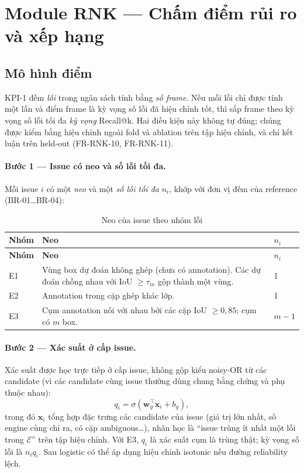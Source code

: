 \section{Module RNK — Chấm điểm rủi ro và xếp hạng}
\label{sec:fr-rnk}

\subsection{Mô hình điểm}
KPI-1 đếm \emph{lỗi} trong ngân sách tính bằng \emph{số frame}. Nếu mỗi lỗi chỉ
được tính một lần và điểm frame là kỳ vọng số lỗi đã hiệu chỉnh tốt, thì sắp
frame theo kỳ vọng số lỗi tối đa \emph{kỳ vọng} Recall@k. Hai điều kiện này không
tự đúng; chúng được kiểm bằng hiệu chỉnh ngoài fold và ablation trên tập hiệu
chỉnh, và chỉ kết luận trên held-out (FR-RNK-10, FR-RNK-11).

\paragraph{Bước 1 — Issue có neo và số lỗi tối đa.}
Mỗi issue \(i\) có một \emph{neo} và một \emph{số lỗi tối đa} \(n_i\), khớp với
đơn vị đếm của reference (BR-01…BR-04):

\begin{xltabular}{\linewidth}{@{}L{1.2cm}L{5.4cm}Y@{}}
\caption{Neo của issue theo nhóm lỗi}\label{tab:anchors}\\
\toprule
\textbf{Nhóm} & \textbf{Neo} & \textbf{\(n_i\)}\\
\midrule
\endfirsthead
\toprule \textbf{Nhóm} & \textbf{Neo} & \textbf{\(n_i\)}\\ \midrule
\endhead
\bottomrule
\endfoot
E1 & Vùng box dự đoán không ghép (chưa có annotation). Các dự đoán chồng nhau với IoU $\ge \tau_m$ gộp thành một vùng. & 1\\
E2 & Annotation trong cặp ghép khác lớp. & 1\\
E3 & Cụm annotation nối với nhau bởi các cặp IoU $\ge 0{,}85$; cụm có \(m\) box. & \(m-1\)\\
\end{xltabular}

\paragraph{Bước 2 — Xác suất ở cấp issue.}
Xác suất được học trực tiếp ở cấp issue, không gộp kiểu noisy-OR từ các
candidate (vì các candidate cùng issue thường dùng chung bằng chứng và phụ thuộc
nhau):
\[
  q_i = \sigma\!\left(\mathbf{w}_g^{\top}\mathbf{x}_i + b_g\right),
\]
trong đó \(\mathbf{x}_i\) tổng hợp đặc trưng các candidate của issue (giá trị lớn
nhất, số engine cùng chỉ ra, có cặp ambiguous…), nhãn học là ``issue trùng ít
nhất một lỗi trong \(\mathcal{E}\)'' trên tập hiệu chỉnh. Với E3, \(q_i\) là xác
suất cụm là trùng thật; kỳ vọng số lỗi là \(n_i q_i\). Sau logistic có thể áp
dụng hiệu chỉnh isotonic nếu đường reliability lệch.

